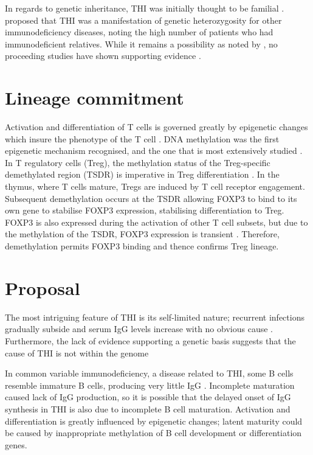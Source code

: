 \documentclass[12pt]{article}
\begin{document}
			In regards to genetic inheritance, THI was initially thought to be familial \citep{Willenbockel60}. 
			\citet{Soothill68} proposed that THI was a manifestation of genetic heterozygosity for other immunodeficiency diseases, noting the high number of patients who had immunodeficient relatives.
			While it remains a possibility as noted by \citet{McGeady87}, no proceeding studies have shown supporting evidence \citep{Tiller78,Fiorilli86, Ovadia14}.
			
			
	\section{Lineage commitment}

		Activation and differentiation of T cells is governed greatly by epigenetic changes which insure the phenotype of the T cell \citep{Zeng13}.
		DNA methylation was the first epigenetic mechanism recognised, and the one that is most extensively studied \citep{Begin14}. 
		In T regulatory cells (Treg), the methylation status of the Treg-specific demethylated region (TSDR) is imperative in Treg differentiation \citep{Polansky08}.
		In the thymus, where T cells mature, Tregs are induced by T cell receptor engagement. 
		Subsequent demethylation occurs at the TSDR allowing FOXP3 to bind to its own gene to stabilise FOXP3 expression, stabilising differentiation to Treg.
		FOXP3 is also expressed during the activation of other T cell subsets, but due to the methylation of the TSDR, FOXP3 expression is transient \citep{Ohkura13}.
		Therefore, demethylation permits FOXP3 binding and thence confirms Treg lineage.
		
	\section{Proposal}
	
		The most intriguing feature of THI is its self-limited nature; recurrent infections gradually subside and serum IgG levels increase with no obvious cause  \citep{Tiller78,Soothill68,Siegel81,McGeady87,Dressler89,Kowalczyk97,Dalal98}. 
		Furthermore, the lack of evidence supporting a genetic basis suggests that the cause of THI is not within the genome \citep{Tiller78,Fiorilli86,Ovadia14}
		
		In common variable immunodeficiency, a disease related to THI, some B cells resemble immature B cells, producing very little IgG \citep{Fiorilli86}. 
		Incomplete maturation caused lack of IgG production, so it is possible that the delayed onset of IgG synthesis in THI is also due to incomplete B cell maturation.
		Activation and differentiation is greatly influenced by epigenetic changes; latent maturity could be caused by inappropriate methylation of B cell development or differentiation genes. 
\end{document}
